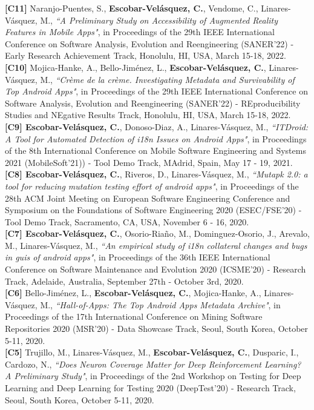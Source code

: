 \documentclass[letterpaper,11pt,oneside]{article}
\begin{document}
\noindent \textbf{[C11]} Naranjo-Puentes, S., \textbf{Escobar-Velásquez, C.}, Vendome, C., Linares-V\'asquez,  M., \textit{``A Preliminary Study on Accessibility of Augmented Reality Features in Mobile Apps"}, in Proceedings of the 29th IEEE International Conference on Software Analysis, Evolution and Reengineering (SANER'22) - Early Research Achievement Track, Honolulu, HI, USA, March 15-18, 2022. \\
\noindent \textbf{[C10]} Mojica-Hanke, A., Bello-Jiménez, L., \textbf{Escobar-Velásquez, C.}, Linares-V\'asquez,  M., \textit{``Cr\`eme de la cr\`eme. Investigating Metadata and Survivability of Top Android Apps"}, in Proceedings of the 29th IEEE International Conference on Software Analysis, Evolution and Reengineering (SANER'22) - REproducibility Studies and NEgative Results Track, Honolulu, HI, USA, March 15-18, 2022. \\\newpage
\noindent \textbf{[C9] Escobar-Velásquez, C.}, Donoso-Diaz, A., Linares-V\'asquez,  M., \textit{``ITDroid: A Tool for Automated Detection of i18n Issues on Android Apps"}, in Proceedings of the 8th International Conference on Mobile Software Engineering and Systems 2021 (MobileSoft'21)) - Tool Demo Track, MAdrid, Spain, May 17 - 19, 2021. \\
\noindent \textbf{[C8] Escobar-Velásquez, C.}, Riveros, D., Linares-V\'asquez,  M., \textit{``Mutapk 2.0: a tool for reducing mutation testing effort of android apps"}, in Proceedings of the 28th ACM Joint Meeting on European Software Engineering Conference and Symposium on the Foundations of Software Engineering 2020 (ESEC/FSE’20) - Tool Demo Track, Sacramento, CA, USA, November 6 - 16, 2020. \\
\noindent \textbf{[C7] Escobar-Velásquez, C.}, Osorio-Ria\~no, M., Dominguez-Osorio, J., Arevalo, M., Linares-V\'asquez,  M., \textit{``An empirical study of i18n collateral changes and bugs in guis of android apps"}, in Proceedings of the 36th IEEE International Conference on Software Maintenance and Evolution 2020 (ICSME’20) - Research Track, Adelaide, Australia, September 27th - October 3rd, 2020. \\
\noindent \textbf{[C6]} Bello-Jiménez, L., \textbf{Escobar-Velásquez, C.}, Mojica-Hanke, A., Linares-V\'asquez,  M., \textit{``Hall-of-Apps: The Top Android Apps Metadata Archive"}, in Proceedings of the 17th International Conference on Mining Software Repositories 2020 (MSR’20) - Data Showcase Track, Seoul, South Korea, October 5-11, 2020. \\
\noindent \textbf{[C5]} Trujillo, M., Linares-V\'asquez,  M., \textbf{Escobar-Velásquez, C.}, Dusparic, I., Cardozo, N., \textit{``Does Neuron Coverage Matter for Deep Reinforcement Learning? A Preliminary Study"}, in Proceedings of the 2nd Workshop on Testing for Deep Learning and Deep Learning for Testing 2020 (DeepTest’20) - Research Track, Seoul, South Korea, October 5-11, 2020. \\
\end{document}
